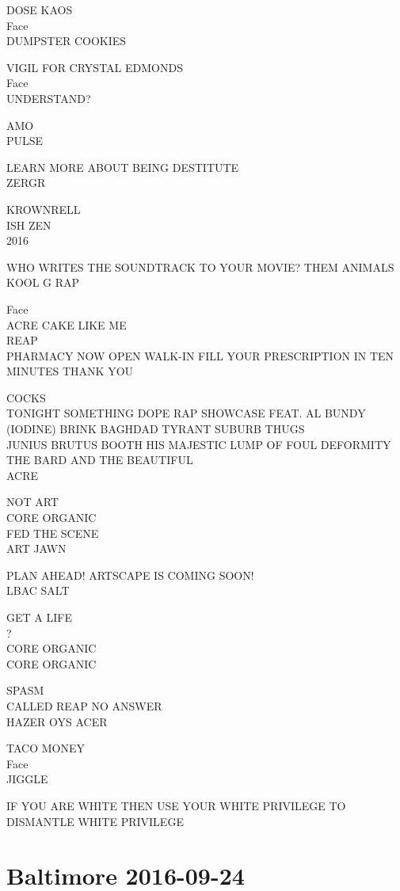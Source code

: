 \documentclass[10pt,letterpaper]{article}
\begin{document}
DOSE KAOS\\
Face\\
DUMPSTER COOKIES

VIGIL FOR CRYSTAL EDMONDS\\
Face\\
UNDERSTAND?

AMO\\
PULSE

LEARN MORE ABOUT BEING DESTITUTE\\
ZERGR

KROWNRELL\\
ISH ZEN\\
2016

WHO WRITES THE SOUNDTRACK TO YOUR MOVIE?  THEM ANIMALS\\
KOOL G RAP

Face\\
ACRE CAKE LIKE ME\\
REAP\\
PHARMACY NOW OPEN WALK{-}IN FILL YOUR PRESCRIPTION IN TEN MINUTES THANK YOU

COCKS\\
TONIGHT SOMETHING DOPE RAP SHOWCASE FEAT. AL BUNDY (IODINE) BRINK BAGHDAD TYRANT SUBURB THUGS\\
JUNIUS BRUTUS BOOTH HIS MAJESTIC LUMP OF FOUL DEFORMITY THE BARD AND THE BEAUTIFUL\\
ACRE

NOT ART\\
CORE ORGANIC\\
FED THE SCENE\\
ART JAWN

PLAN AHEAD!  ARTSCAPE IS COMING SOON!\\
LBAC SALT

GET A LIFE\\
?\\
CORE ORGANIC\\
CORE ORGANIC

SPASM\\
CALLED REAP NO ANSWER\\
HAZER OYS ACER

TACO MONEY\\
Face\\
JIGGLE

IF YOU ARE WHITE THEN USE YOUR WHITE PRIVILEGE TO DISMANTLE WHITE PRIVILEGE
\pagebreak

\section*{Baltimore 2016-09-24}
\end{document}
